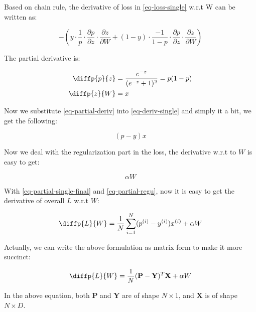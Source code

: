\documentclass[a4paper, 12pt]{article}
\begin{document}
Based on chain rule, the derivative of loss in \cref{eq-loss-single} w.r.t W can be written as:

\begin{equation}\label{eq-deriv-single}
    -\left (y \cdot \frac{1}{p}\cdot \frac{\partial p}{\partial z} \cdot \frac{\partial z}{\partial W} + (1-y)\cdot
        \frac{-1}{1-p}\cdot \frac{\partial p} {\partial z} \cdot \frac{\partial z}{\partial W} \right)
\end{equation}

The partial derivative is:

\begin{equation}\label{eq-partial-deriv}
    \begin{aligned}
        \diffp{p}{z} &= \frac{e^{-z}}{(e^{-z} + 1)^2} = p(1-p)\\
        \diffp{z}{W} &= x
    \end{aligned}
\end{equation}

Now we substitute \cref{eq-partial-deriv} into \cref{eq-deriv-single} and simply it a bit, we get the following:

\begin{equation}\label{eq-partial-single-final}
    (p - y)x
\end{equation}

Now we deal with the regularization part in the loss, the derivative w.r.t to $W$ is easy to get:

\begin{equation}\label{eq-partial-regu}
    \alpha W
\end{equation}

With \cref{eq-partial-single-final} and \cref{eq-partial-regu}, now it is easy to get the derivative of overall $L$
w.r.t $W$:

\begin{equation}\label{eq-deriv-L-to_w-non-matrix}
    \diffp{L}{W} = \frac{1}{N} \sum_{i=1}^{N} (p^{(i)} - y^{(i)}) x^{(i)} + \alpha W
\end{equation}

Actually, we can write the above formulation as matrix form to make it more succinct:

\begin{equation}\label{eq-deriv-L-to_w-matrix}
    \diffp{L}{W} = \frac{1}{N} (\mathbf{P} - \mathbf{Y})^T \mathbf{X} + \alpha W
\end{equation}

In the above equation, both $\mathbf{P}$ and $\mathbf{Y}$ are of shape $N\times 1$,
and $\mathbf{X}$ is of shape $N\times D$.
\end{document}
